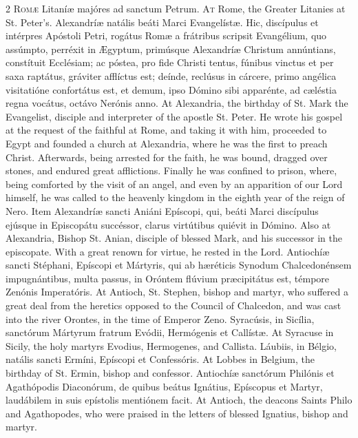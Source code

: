 \begin{paracol}{2}
\lettrine[lines=1]{R}{omæ} Litaníæ majóres ad sanctum Petrum.
\switchcolumn
{}
\lettrine[lines=1]{A}{t} Rome, the Greater Litanies at St. Peter's.
\switchcolumn*
{}
Alexandríæ natális 
 beáti Marci Evangelístæ. Hic, discípulus et intérpres Apóstoli Petri, 
 rogátus Romæ a frátribus scripsit Evangélium, quo assúmpto, perréxit in 
 Ægyptum, primúsque Alexandríæ Christum annúntians, constítuit Ecclésiam; ac 
 póstea, pro fide Christi tentus, fúnibus vinctus et per saxa raptátus, 
 gráviter afflíctus est; deínde, reclúsus in cárcere, primo angélica visitatióne confortátus est, et demum, ipso Dómino sibi apparénte, ad 
 cæléstia regna vocátus, octávo Nerónis anno.
\switchcolumn
{}
At Alexandria, the birthday of St. 
 Mark the Evangelist, disciple and interpreter of the apostle St. Peter. 
 He wrote his gospel at the request of the faithful at Rome, and taking it 
 with him, proceeded to Egypt and founded a church at Alexandria, where he 
 was the first to preach Christ. Afterwards, being arrested for the 
 faith, he was bound, dragged over stones, and endured great afflictions. 
 Finally he was confined to prison, where, being comforted by the visit of an 
 angel, and even by an apparition of our Lord himself, he was called to the 
 heavenly kingdom in the eighth year of the reign of Nero.
\switchcolumn*
{}
Item Alexandríæ sancti 
 Aniáni Epíscopi, qui, beáti Marci discípulus ejúsque in Episcopátu 
 succéssor, clarus virtútibus quiévit in Dómino.
\switchcolumn
{}
Also at Alexandria, Bishop St. 
 Anian, disciple of blessed Mark, and his successor in the episcopate. 
 With a great renown for virtue, he rested in the Lord.
\switchcolumn*
{}
Antiochíæ sancti 
 Stéphani, Epíscopi et Mártyris, qui ab hæréticis Synodum Chalcedonénsem 
 impugnántibus, multa passus, in Oróntem flúvium præcipitátus est, témpore 
 Zenónis Imperatóris.
\switchcolumn
{}
At Antioch, St. Stephen, bishop and 
 martyr, who suffered a great deal from the heretics opposed to the Council 
 of Chalcedon, and was cast into the river Orontes, in the time of Emperor 
 Zeno.
\switchcolumn*
{}
Syracúsis, in Sicília, 
 sanctórum Mártyrum fratrum Evódii, Hermógenis et Callístæ.
\switchcolumn
{}
At Syracuse in Sicily, the holy 
 martyrs Evodius, Hermogenes, and Callista.
\switchcolumn*
{}
Láubiis, in Bélgio, 
 natális sancti Ermíni, Epíscopi et Confessóris.
\switchcolumn
{}
At Lobbes in Belgium, the birthday 
 of St. Ermin, bishop and confessor.
\switchcolumn*
{}
Antiochíæ sanctórum 
 Philónis et Agathópodis Diaconórum, de quibus beátus Ignátius, Epíscopus et 
 Martyr, laudábilem in suis epístolis mentiónem facit.
\switchcolumn
{}
At Antioch, the deacons Saints 
 Philo and Agathopodes, who were praised in the letters of blessed Ignatius, 
 bishop and martyr.
\switchcolumn*
{}
\end{paracol}


